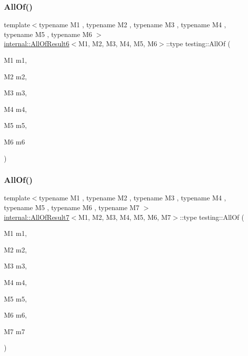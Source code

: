\subsubsection{\texorpdfstring{AllOf()}{AllOf()}\hspace{0.1cm}{\footnotesize\ttfamily [5/9]}}
{\footnotesize\ttfamily template$<$typename M1 , typename M2 , typename M3 , typename M4 , typename M5 , typename M6 $>$ \\
\mbox{\hyperlink{structtesting_1_1internal_1_1_all_of_result6}{internal\+::\+All\+Of\+Result6}}$<$M1, M2, M3, M4, M5, M6$>$\+::type testing\+::\+All\+Of (\begin{DoxyParamCaption}\item[{M1}]{m1,  }\item[{M2}]{m2,  }\item[{M3}]{m3,  }\item[{M4}]{m4,  }\item[{M5}]{m5,  }\item[{M6}]{m6 }\end{DoxyParamCaption})\hspace{0.3cm}{\ttfamily [inline]}}

\mbox{\label{namespacetesting_acbd4eef50126ff6db5b93ac5faa71b45}} 
\subsubsection{\texorpdfstring{AllOf()}{AllOf()}\hspace{0.1cm}{\footnotesize\ttfamily [6/9]}}
{\footnotesize\ttfamily template$<$typename M1 , typename M2 , typename M3 , typename M4 , typename M5 , typename M6 , typename M7 $>$ \\
\mbox{\hyperlink{structtesting_1_1internal_1_1_all_of_result7}{internal\+::\+All\+Of\+Result7}}$<$M1, M2, M3, M4, M5, M6, M7$>$\+::type testing\+::\+All\+Of (\begin{DoxyParamCaption}\item[{M1}]{m1,  }\item[{M2}]{m2,  }\item[{M3}]{m3,  }\item[{M4}]{m4,  }\item[{M5}]{m5,  }\item[{M6}]{m6,  }\item[{M7}]{m7 }\end{DoxyParamCaption})\hspace{0.3cm}{\ttfamily [inline]}}

